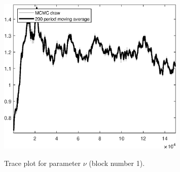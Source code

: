 \begin{figure}[H]
\centering
  \includegraphics[width=0.8\textwidth]{BRS_sectoral_KK/graphs/TracePlot_nu_blck_1}\\
    \caption{Trace plot for parameter $\nu$ (block number 1).}
\end{figure}
